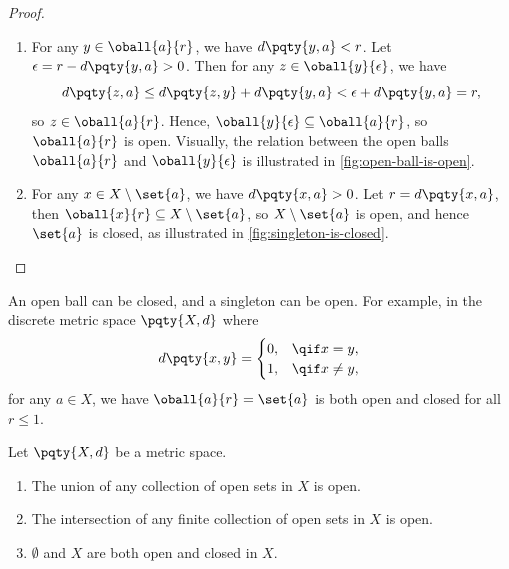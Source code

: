 \begin{proof}
    \begin{enumerate}[label=(\roman*)]
        \item For any \(y \in \oball{a}{r}\), we have \(d\pqty{y, a} < r\). Let \(\epsilon = r - d\pqty{y, a} > 0\). Then for any \(z \in \oball{y}{\epsilon}\), we have
        \[
            d\pqty{z, a} \leq d\pqty{z, y} + d\pqty{y, a} < \epsilon + d\pqty{y, a} = r,
        \]
        so \(z \in \oball{a}{r}\). Hence, \(\oball{y}{\epsilon} \subseteq \oball{a}{r}\), so \(\oball{a}{r}\) is open. Visually, the relation between the open balls \(\oball{a}{r}\) and \(\oball{y}{\epsilon}\) is illustrated in \autoref{fig:open-ball-is-open}.

        \item For any \(x \in X \setminus \set{a}\), we have \(d\pqty{x, a} > 0\). Let \(r = d\pqty{x, a}\), then \(\oball{x}{r} \subseteq X \setminus \set{a}\), so \(X \setminus \set{a}\) is open, and hence \(\set{a}\) is closed, as illustrated in \autoref{fig:singleton-is-closed}.
    \end{enumerate}
\end{proof}

\begin{remark}
    An open ball can be closed, and a singleton can be open. For example, in the discrete metric space \(\pqty{X, d}\) where
    \[
        d\pqty{x, y} = \begin{cases}
            0, & \qif x = y,\\
            1, & \qif x \neq y,
        \end{cases}
    \]
    for any \(a \in X\), we have \(\oball{a}{r} = \set{a}\) is both open and closed for all \(r \leq 1\).
\end{remark}

\begin{theorem}
    \label{thm:unions-and-intersections-of-open-sets}%
    Let \(\pqty{X, d}\) be a metric space.

    \begin{enumerate}[label=(\roman*)]
        \item The union of any collection of open sets in \(X\) is open.
        \item The intersection of any finite collection of open sets in \(X\) is open.
        \item \(\emptyset\) and \(X\) are both open and closed in \(X\).
    \end{enumerate}
\end{theorem}


